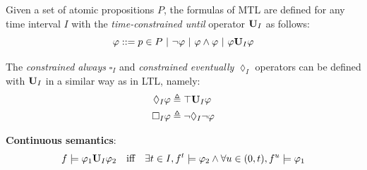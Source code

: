 \documentclass{beamer}
\theoremstyle{definition}
\begin{document}
\begin{frame}
  \small
  \begin{definition}
    Given a set of atomic propositions $P$, the formulas of MTL are defined for any time interval $I$ with the \emph{time-constrained until} operator $\text{\bf U}_I$ as follows:
    \begin{equation*}
      \varphi ::= p \in P\ |\ \neg \varphi\ |\ \varphi \land \varphi\ |\ \varphi \text{\bf U}_I \varphi
    \end{equation*}
  \end{definition}
  \vfill
  The \emph{constrained always} $\square_I$ and \emph{constrained eventually} $\lozenge_I$ operators can be defined with $\text{\bf U}_I$ in a similar way as in LTL, namely:
  \begin{align*}
    \lozenge_I \varphi &\triangleq \top \text{\bf U}_I \varphi\\
    \square_I \varphi &\triangleq \neg \lozenge_I \neg \varphi
  \end{align*}
  \vfill
\end{frame}

\begin{frame}
\textbf{Continuous semantics}:
$$f \models \varphi_1 \text{\bf U}_I \varphi_2 \quad \text{iff} \quad \exists t \in I, f^t \models \varphi_2 \land \forall u \in (0, t), f^u \models \varphi_1$$
\end{frame}
\end{document}
